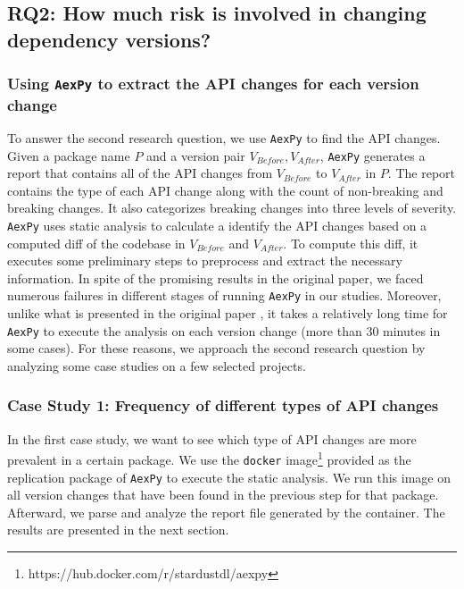 \documentclass[conference]{IEEEtran}
\begin{document}
\subsection{RQ2: How much risk is involved in changing dependency versions?}

\subsubsection{Using \texttt{AexPy} to extract the API changes for each version change}
To answer the second research question, we use \texttt{AexPy} \cite{aexpy} to find the API changes. Given a package name $P$ and a version pair $V_{Before}, V_{After}$, \texttt{AexPy} generates a report that contains all of the API changes from $V_{Before}$ to $V_{After}$ in $P$. The report contains the type of each API change along with the count of non-breaking and breaking changes. It also categorizes breaking changes into three levels of severity. \texttt{AexPy} uses static analysis to calculate a identify the API changes based on a computed diff of the codebase in $V_{Before}$ and $V_{After}$. To compute this diff, it executes some preliminary steps to preprocess and extract the necessary information. In spite of the promising results in the original paper, we faced numerous failures in different stages of running \texttt{AexPy} in our studies. Moreover, unlike what is presented in the original paper \cite{aexpy}, it takes a relatively long time for \texttt{AexPy} to execute the analysis on each version change (more than 30 minutes in some cases). For these reasons, we approach the second research question by analyzing some case studies on a few selected projects.

\subsubsection{Case Study 1: Frequency of different types of API changes}
In the first case study, we want to see which type of API changes are more prevalent in a certain package. We use the \texttt{docker} image\footnote{https://hub.docker.com/r/stardustdl/aexpy} provided as the replication package of \texttt{AexPy} to execute the static analysis. We run this image on all version changes that have been found in the previous step for that package. Afterward, we parse and analyze the report file generated by the container. The results are presented in the next section.
\end{document}
